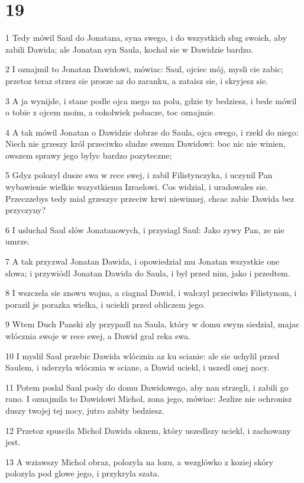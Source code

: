 \chapter{19}

\par 1 Tedy mówil Saul do Jonatana, syna swego, i do wszystkich slug swoich, aby zabili Dawida; ale Jonatan syn Saula, kochal sie w Dawidzie bardzo.
\par 2 I oznajmil to Jonatan Dawidowi, mówiac: Saul, ojciec mój, mysli cie zabic; przetoz teraz strzez sie prosze az do zaranku, a zataisz sie, i skryjesz sie.
\par 3 A ja wynijde, i stane podle ojca mego na polu, gdzie ty bedziesz, i bede mówil o tobie z ojcem moim, a cokolwiek pobacze, toc oznajmie.
\par 4 A tak mówil Jonatan o Dawidzie dobrze do Saula, ojca swego, i rzekl do niego: Niech nie grzeszy król przeciwko sludze swemu Dawidowi: boc nic nie winien, owszem sprawy jego bylyc bardzo pozyteczne;
\par 5 Gdyz polozyl dusze swa w rece swej, i zabil Filistynczyka, i uczynil Pan wybawienie wielkie wszystkiemu Izraelowi. Cos widzial, i uradowales sie. Przeczzebys tedy mial grzeszyc przeciw krwi niewinnej, chcac zabic Dawida bez przyczyny?
\par 6 I usluchal Saul slów Jonatanowych, i przysiagl Saul: Jako zywy Pan, ze nie umrze.
\par 7 A tak przyzwal Jonatan Dawida, i opowiedzial mu Jonatan wszystkie one slowa; i przywiódl Jonatan Dawida do Saula, i byl przed nim, jako i przedtem.
\par 8 I wszczela sie znowu wojna, a ciagnal Dawid, i walczyl przeciwko Filistynom, i porazil je porazka wielka, i uciekli przed obliczem jego.
\par 9 Wtem Duch Panski zly przypadl na Saula, który w domu swym siedzial, majac wlócznia swoje w rece swej, a Dawid gral reka swa.
\par 10 I myslil Saul przebic Dawida wlócznia az ku scianie: ale sie uchylil przed Saulem, i uderzyla wlócznia w sciane, a Dawid uciekl, i uszedl onej nocy.
\par 11 Potem poslal Saul posly do domu Dawidowego, aby nan strzegli, i zabili go rano. I oznajmila to Dawidowi Michol, zona jego, mówiac: Jezlize nie ochronisz duszy twojej tej nocy, jutro zabity bedziesz.
\par 12 Przetoz spuscila Michol Dawida oknem, który uszedlszy uciekl, i zachowany jest.
\par 13 A wziawszy Michol obraz, polozyla na lozu, a wezglówko z koziej skóry polozyla pod glowe jego, i przykryla szata.
